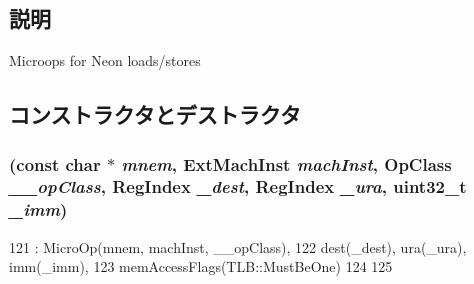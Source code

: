 \subsection{説明}
Microops for Neon loads/stores 

\subsection{コンストラクタとデストラクタ}
\hypertarget{classArmISA_1_1MicroNeonMemOp_a9ec783f147082cdedf23edaec11108bc}{
\subsubsection[{MicroNeonMemOp}]{ (const char $\ast$ {\em mnem}, \/  {\bf ExtMachInst} {\em machInst}, \/  OpClass {\em \_\-\_\-opClass}, \/  {\bf RegIndex} {\em \_\-dest}, \/  {\bf RegIndex} {\em \_\-ura}, \/  {\bf uint32\_\-t} {\em \_\-imm})}}
\label{classArmISA_1_1MicroNeonMemOp_a9ec783f147082cdedf23edaec11108bc}



\begin{DoxyCode}
121             : MicroOp(mnem, machInst, __opClass),
122               dest(_dest), ura(_ura), imm(_imm),
123               memAccessFlags(TLB::MustBeOne)
124     {
125     }
\end{DoxyCode}


